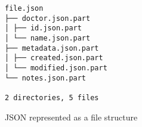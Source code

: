 \begin{listing}[H]
  \centering
  \begin{verbatim}
file.json
├── doctor.json.part
│ ├── id.json.part
│ └── name.json.part
├── metadata.json.part
│ ├── created.json.part
│ └── modified.json.part
└── notes.json.part

2 directories, 5 files
  \end{verbatim}
  \caption{
    JSON represented as a file structure
  }
  \label{code:json_file_structure}
\end{listing}